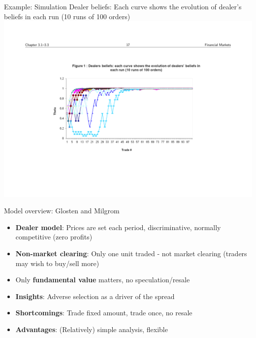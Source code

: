 \documentclass[english,10pt]{beamer}
\begin{document}
\begin{frame}{Example: Simulation}
	Dealer beliefs: Each curve shows the evolution of dealer's beliefs in each run (10 runs of 100 orders)
	\quad
	\center
	\includegraphics[width=1\linewidth]{pics/DealerBeliefs_Image.pdf}
\end{frame}


\begin{frame}[label=overview]{Model overview: Glosten and Milgrom}
	\begin{itemize}
		\item \textbf{Dealer model}: Prices are set each period, discriminative, normally competitive (zero profits)
		\item \textbf{Non-market clearing}: Only one unit traded  - not market clearing (traders may wish to buy/sell more)
		\item Only \textbf{fundamental value} matters,  no speculation/resale
	\end{itemize}
	\begin{itemize}
		\item \textbf{Insights}: Adverse selection as a driver of the spread
		\item \textbf{Shortcomings}: Trade fixed amount, trade once, no resale
		\item \textbf{Advantages}: (Relatively) simple analysis, flexible %
	\end{itemize}
\end{frame}
\end{document}
